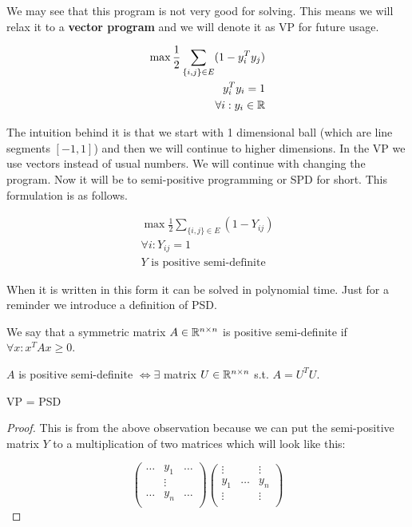 We may see that this program is not very good for solving. This means we will relax it to a \textbf{vector program} and we will denote it as VP for future usage.

$$
\begin{aligned}
	\max \frac{1}{2} \sum_{\{i,j\} \in E} (1 - y_i^T y_j) \\
	y_i^T y_i = 1 \\ 
	\forall i : y_{i} \in \mathbb{R}
\end{aligned}
$$

The intuition behind it is that we start with 1 dimensional ball (which are line segments $[-1,1]$) and then we will continue to higher dimensions. In the VP we use vectors instead of usual numbers. We will continue with changing the program. Now it will be to semi-positive programming or SPD for short. This formulation is as follows.

$$
\begin{aligned}
	\max \frac{1}{2} \sum_{\{i,j\} \in E} (1 - Y_{ij}) \\
	\forall i : Y_{ij} = 1 \\
	Y \text{ is positive semi-definite}
\end{aligned}
$$

When it is written in this form it can be solved in polynomial time. Just for a reminder we introduce a definition of PSD.

\begin{defn}
	We say that a symmetric matrix $A \in \mathbb{R}^{n \times n}$ is positive semi-definite if $\forall x : x^T A x \geq 0$.
\end{defn}

\begin{observ}
	$A$ is positive semi-definite $\Leftrightarrow \exists$ matrix $U \in \mathbb{R}^{n \times n}$ s.t. $A = U^T U$. 
\end{observ}

\begin{observ}
	VP = PSD
\end{observ}

\begin{proof}
	This is from the above observation because we can put the semi-positive matrix $Y$ to a multiplication of two matrices which will look like this:
	
	$$
	\begin{pmatrix}
		\dots & y_1 & \dots \\
		& \vdots & \\
		\dots & y_n & \dots \\
	\end{pmatrix}
	\begin{pmatrix}
		\vdots &  & \vdots \\
		y_1 & \dots & y_n\\
		\vdots &  & \vdots \\
	\end{pmatrix}
	$$
\end{proof}

